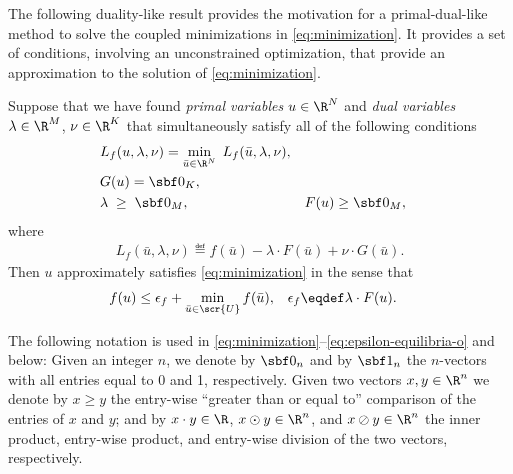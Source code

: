 \documentclass[11pt]{article}
\begin{document}
The following duality-like result provides the motivation for a
primal-dual-like method to solve the coupled minimizations in
\eqref{eq:minimization}. It provides a set of
conditions, involving an unconstrained optimization, that provide an
approximation to the solution of \eqref{eq:minimization}.
\begin{lemma}\label{le:minima-gap}
  Suppose that we have found \emph{primal variables} $u\in\R^{N}$
  and \emph{dual variables} $\lambda\in\R^{M}$, $\nu\in\R^{K}$ that
  simultaneously satisfy all of the following
  conditions
  \begin{subequations}
    \begin{align}
      \label{eq:central-points}
      &L_f(u,\lambda,\nu) =\min_{\bar u\in\R^{N}}\; L_f(\bar u,\lambda,\nu), \\
      \label{eq:equality-constraints}
      &G(u)=\sbf 0_K, \\
      \label{eq:inequality-constraints}
      &\lambda\;\ge\;\sbf 0_M, & &F(u)\ge\sbf 0_M,
    \end{align}
  \end{subequations}
  where
  \begin{align*}
    L_f(\bar u,\lambda,\nu)\eqdef f(\bar u)-\lambda\cdot F(\bar u)+\nu\cdot G(\bar u). 
  \end{align*}
  Then $u$ approximately
  satisfies \eqref{eq:minimization} in the sense that
  \begin{align}\label{eq:epsilon-equilibria-o}
    f(u)&\le\epsilon_f+\min_{\bar u\in\scr{U}} f(\bar u), &
    \epsilon_f&\eqdef \lambda\cdot F(u).
  \end{align}
  \frqed
\end{lemma}
The following notation is used in
\eqref{eq:minimization}--\eqref{eq:epsilon-equilibria-o} and below:
Given an integer $n$, we denote by $\sbf 0_n$ and by $\sbf 1_n$ the
$n$-vectors with all entries equal to 0 and 1, respectively. Given two
vectors $x,y\in\R^n$ we denote by $x\ge y$ the entry-wise ``greater than or
equal to'' comparison of the entries of $x$ and $y$; and by $x\cdot y\in\R$,
$x\odot y\in\R^n$, and $x\oslash y\in\R^n$ the inner product, entry-wise
product, and entry-wise division of the two vectors, respectively.
\end{document}
